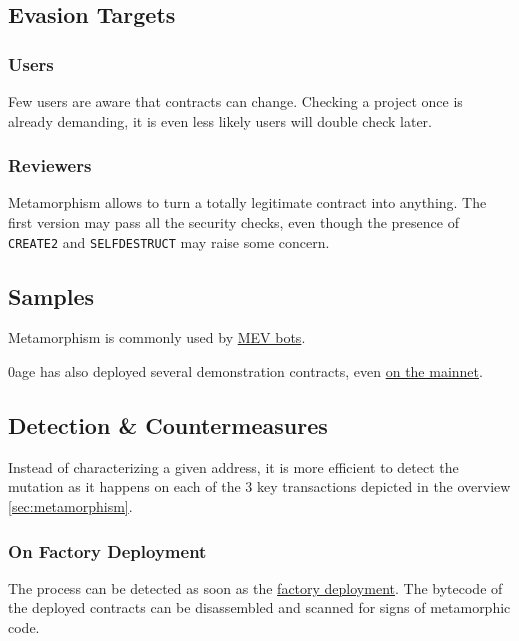 \subsection{Evasion Targets}

\subsubsection{Users}

Few users are aware that contracts can change.
Checking a project once is already demanding, it is even less likely users will double check later.

\subsubsection{Reviewers}

Metamorphism allows to turn a totally legitimate contract into anything.
The first version may pass all the security checks, even though the presence of \lstinline{CREATE2} and \lstinline{SELFDESTRUCT} may raise some concern.

\subsection{Samples}

Metamorphism is commonly used by \href{\urltxmevbotmutation}{MEV bots}.

0age has also deployed several demonstration contracts, even \href{\urladdressmetamorphicfactory}{on the mainnet}.

\subsection{Detection \& Countermeasures}

Instead of characterizing a given address, it is more efficient to detect the mutation as it happens on each of the 3 key transactions depicted in the overview \ref{sec:metamorphism}.

\subsubsection{On Factory Deployment}

The process can be detected as soon as the \href{\urltxmetamorphismstepone}{factory deployment}.
The bytecode of the deployed contracts can be disassembled and scanned for signs of metamorphic code.



